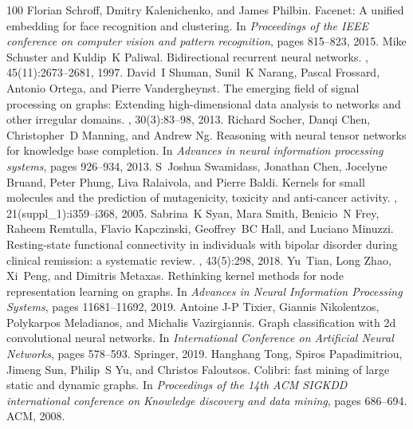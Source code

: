 \begin{thebibliography}{100}
Florian Schroff, Dmitry Kalenichenko, and James Philbin.
\newblock Facenet: A unified embedding for face recognition and clustering.
\newblock In {\em Proceedings of the IEEE conference on computer vision and
  pattern recognition}, pages 815--823, 2015.
Mike Schuster and Kuldip~K Paliwal.
\newblock Bidirectional recurrent neural networks.
, 45(11):2673--2681,
  1997.
David~I Shuman, Sunil~K Narang, Pascal Frossard, Antonio Ortega, and Pierre
  Vandergheynst.
\newblock The emerging field of signal processing on graphs: Extending
  high-dimensional data analysis to networks and other irregular domains.
, 30(3):83--98, 2013.
Richard Socher, Danqi Chen, Christopher~D Manning, and Andrew Ng.
\newblock Reasoning with neural tensor networks for knowledge base completion.
\newblock In {\em Advances in neural information processing systems}, pages
  926--934, 2013.
S~Joshua Swamidass, Jonathan Chen, Jocelyne Bruand, Peter Phung, Liva
  Ralaivola, and Pierre Baldi.
\newblock Kernels for small molecules and the prediction of mutagenicity,
  toxicity and anti-cancer activity.
, 21(suppl\_1):i359--i368, 2005.
Sabrina~K Syan, Mara Smith, Benicio~N Frey, Raheem Remtulla, Flavio Kapczinski,
  Geoffrey~BC Hall, and Luciano Minuzzi.
\newblock Resting-state functional connectivity in individuals with bipolar
  disorder during clinical remission: a systematic review.
, 43(5):298, 2018.
Yu~Tian, Long Zhao, Xi~Peng, and Dimitris Metaxas.
\newblock Rethinking kernel methods for node representation learning on graphs.
\newblock In {\em Advances in Neural Information Processing Systems}, pages
  11681--11692, 2019.
Antoine J-P Tixier, Giannis Nikolentzos, Polykarpos Meladianos, and Michalis
  Vazirgiannis.
\newblock Graph classification with 2d convolutional neural networks.
\newblock In {\em International Conference on Artificial Neural Networks},
  pages 578--593. Springer, 2019.
Hanghang Tong, Spiros Papadimitriou, Jimeng Sun, Philip~S Yu, and Christos
  Faloutsos.
\newblock Colibri: fast mining of large static and dynamic graphs.
\newblock In {\em Proceedings of the 14th ACM SIGKDD international conference
  on Knowledge discovery and data mining}, pages 686--694. ACM, 2008.

\end{thebibliography}
